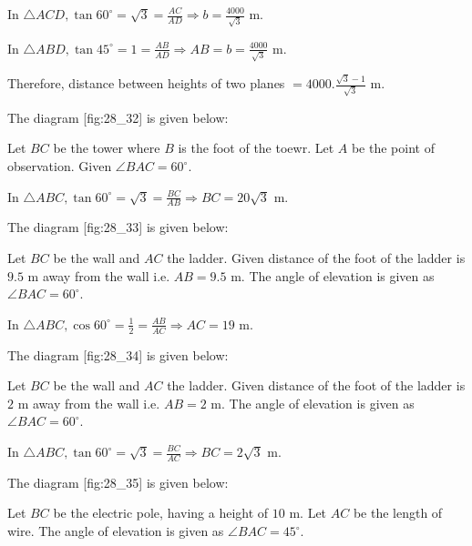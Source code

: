   In $\triangle ACD, \tan60^\circ = \sqrt{3} = \frac{AC}{AD}\Rightarrow b = \frac{4000}{\sqrt{3}}$ m.

  In $\triangle ABD, \tan45^\circ = 1 = \frac{AB}{AD} \Rightarrow AB = b = \frac{4000}{\sqrt{3}}$ m.

  Therefore, distance between heights of two planes $= 4000.\frac{\sqrt{3} - 1}{\sqrt{3}}$ m.

\item The diagram [fig:28_32] is given below:

  \startplacefigure[reference=fig:28_32]
    \externalfigure[28_32.pdf]
  \stopplacefigure

  Let $BC$ be the tower where $B$ is the foot of the toewr. Let $A$ be the point of observation. Given
  $\angle BAC = 60^\circ$.

  In $\triangle ABC, \tan60^\circ = \sqrt{3} = \frac{BC}{AB} \Rightarrow BC = 20\sqrt{3}$ m.

\item The diagram [fig:28_33] is given below:

  \startplacefigure[reference=fig:28_33]
    \externalfigure[28_33.pdf]
  \stopplacefigure

  Let $BC$ be the wall and $AC$ the ladder. Given distance of the foot of the ladder is $9.5$ m away from the
  wall i.e. $AB = 9.5$ m. The angle of elevation is given as $\angle BAC = 60^\circ$.

  In $\triangle ABC, \cos60^\circ = \frac{1}{2} = \frac{AB}{AC} \Rightarrow AC = 19$ m.

\item The diagram [fig:28_34] is given below:

  \startplacefigure[reference=fig:28_34]
    \externalfigure[28_34.pdf]
  \stopplacefigure

  Let $BC$ be the wall and $AC$ the ladder. Given distance of the foot of the ladder is $2$ m away from the
  wall i.e. $AB = 2$ m. The angle of elevation is given as $\angle BAC = 60^\circ$.

  In $\triangle ABC, \tan60^\circ = \sqrt{3} = \frac{BC}{AC} \Rightarrow BC = 2\sqrt{3}$ m.

\item The diagram [fig:28_35] is given below:

  \startplacefigure[reference=fig:28_35]
    \externalfigure[28_35.pdf]
  \stopplacefigure

  Let $BC$ be the electric pole, having a height of $10$ m. Let $AC$ be the length of wire. The angle of
  elevation is given as $\angle BAC=45^\circ$.

